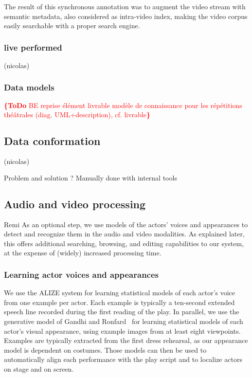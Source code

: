 \documentclass[conference]{IEEEtran}
\newcommand{\todo}[1]{\noindent\textcolor{red}{{\bf \{ToDo} #1{\bf \}}}}
\begin{document}
The result of this synchronous annotation was to augment the video stream with semantic metadata, also considered as intra-video index, making the video corpus easily searchable with a proper search engine.
\subsubsection{live performed} (nicolas)

\subsubsection{Data models}
\todo{BE reprise élément livrable modèle de connaissance pour les répétitions théâtrales (diag. UML+description), cf. livrable}

\subsection{Data conformation} (nicolas)

Problem and solution ? Manually done with internal tools

\subsection{Audio and video processing} Remi
As an optional step, we use models of  the actors' voices and appearances to detect and recognize them
in the audio and video modalities. As explained later, this offers additional searching, browsing, and editing capabilities
to our system, at the expense of (widely) increased processing time.

\subsubsection{Learning actor  voices and appearances}
We use the ALIZE system for learning statistical models of each actor's voice~\cite{Bonastre05}  from one example per actor.
Each example is typically a ten-second extended speech line recorded during the first reading of the play. In parallel,
we use the generative model of Gandhi and Ronfard~\cite{Gandhi13} for learning statistical models of each actor's visual appearance, 
using example images from at least eight viewpoints. Examples are typically extracted from the first dress rehearsal,
as our appearance model is dependent on costumes.  Those models can then be used to automatically align
each performance with the play script and to localize actors on stage and on screen. 
\end{document}

